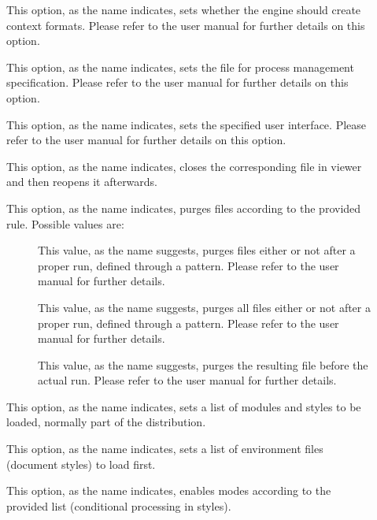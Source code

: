 \begin{description}
\begin{description}
\item[] This option, as the name indicates, sets whether the engine should create context formats. Please refer to the user manual for further details on this option.

\item[] This option, as the name indicates, sets the  file for process management specification. Please refer to the user manual for further details on this option.

\item[] This option, as the name indicates, sets the specified user interface. Please refer to the user manual for further details on this option.

\item[] This option, as the name indicates, closes the corresponding  file in viewer and then reopens it afterwards.

\item[] This option, as the name indicates, purges files according to the provided rule. Possible values are: 

\begin{description}
\item[] This value, as the name suggests, purges files either or not after a proper run, defined through a pattern. Please refer to the user manual for further details.

\item[] This value, as the name suggests, purges all files either or not after a proper run, defined through a pattern. Please refer to the user manual for further details.

\item[] This value, as the name suggests, purges the resulting file before the actual run. Please refer to the user manual for further details.
\end{description}

\item[] This option, as the name indicates, sets a list of modules and styles to be loaded, normally part of the distribution.

\item[] This option, as the name indicates, sets a list of environment files (document styles) to load first.

\item[] This option, as the name indicates, enables modes according to the provided list (conditional processing in styles).


\end{description}
\end{description}
